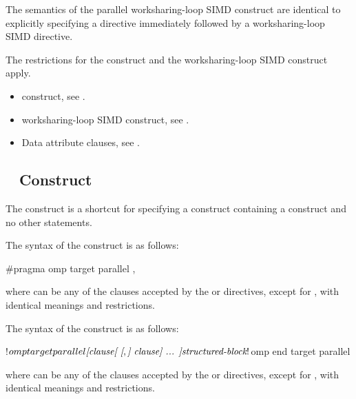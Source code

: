 \descr
The semantics of the parallel worksharing-loop SIMD construct are identical to explicitly specifying
a  directive immediately followed by a worksharing-loop SIMD directive.

\restrictions
The restrictions for the  construct and the worksharing-loop SIMD construct apply.

\crossreferences
\begin{itemize}
\item {} construct, see
.

\item worksharing-loop SIMD construct, see
.

\item Data attribute clauses, see
.
\end{itemize}









\subsection{~ Construct}
\label{subsec:target parallel Construct}
\summary
The   construct is a shortcut for specifying a 
construct containing a  construct and no other statements.

\syntax
\begin{ccppspecific}
The syntax of the   construct is as follows:

\begin{ompcPragma}
#pragma omp target parallel \plc{[clause[ [},\plc{] clause] ... ] new-line}
\end{ompcPragma}

where  can be any of the clauses accepted by the  or
 directives, except for , with identical meanings and restrictions.
\end{ccppspecific}

\begin{samepage}
\begin{fortranspecific}
The syntax of the   construct is as follows:

\begin{ompfPragma}
!$omp target parallel \plc{[clause[ [},\plc{] clause] ... ]}
    \plc{structured-block}
!$omp end target parallel
\end{ompfPragma}

where  can be any of the clauses accepted by the  or
 directives, except for , with identical meanings and restrictions.
\end{fortranspecific}
\end{samepage}


